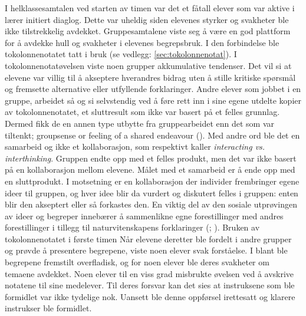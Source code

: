 \documentclass[main.tex]{subfiles}
\begin{document}
I helklassesamtalen ved starten av timen var det et fåtall elever som var aktive i lærer initiert 
diaglog. Dette var uheldig siden elevenes styrker og svakheter ble ikke tilstrekkelig avdekket. 
Gruppesamtalene viste seg å være en god plattform for å avdekke hull og svakheter i elevenes 
begrepsbruk. I den forbindelse ble tokolonnenotatet tatt i bruk (se vedlegg: 
\ref{sec:tokolonnenotat}).
\newline
\newline
I tokolonnenotatøvelsen viste noen grupper akkumulative tendenser. Det vil si at elevene 
var villig til å akseptere hverandres bidrag uten å stille kritiske spørsmål og fremsette
alternative eller utfyllende forklaringer. Andre elever som jobbet i en gruppe, arbeidet så og si
selvstendig ved å føre rett inn i sine egene utdelte kopier av tokolonnenotatet, et sluttresult som 
ikke var basert på et felles grunnlag. Dermed fikk de en annen type utbytte fra gruppearbeidet
enn det som var tiltenkt; \guillemotleft groupsense or feeling of a shared endeavour
\guillemotright (). Med andre ord ble det en samarbeid og ikke 
et kollaborasjon, som  respektivt kaller \emph{interacting vs. interthinking}. 
Gruppen endte opp med et felles produkt, men det var ikke basert på en kollaborasjon mellom elevene. 
Målet med et samarbeid er å ende opp med en sluttprodukt. I motsetning er en kollaborasjon der 
individer frembringer egene ideer til gruppen, og hver idee blir da vurdert og diskutert felles i 
gruppen: enten blir den akseptert eller så forkastes den.
\newline
\newline
En viktig del av den sosiale utprøvingen av ideer og begreper innebærer å sammenlikne egne 
forestillinger med andres forestillinger i tillegg til naturvitenskapens forklaringer 
(; ). Bruken av tokolonnenotatet i første timen 
\newline
\newline
Når elevene deretter ble fordelt i andre grupper og prøvde å presentere begrepene, viste noen elever 
svak forståelse. I blant ble begrepene fremstilt overfladisk, og for noen elever ble deres svakheter 
om temaene avdekket. Noen elever til en viss grad misbrukte øvelsen ved å avskrive notatene til sine 
medelever. Til deres forsvar kan det sies at instruksene som ble formidlet var ikke tydelige nok. 
Uansett ble denne oppførsel irettesatt og klarere instrukser ble formidlet.
\newline
\newline
\end{document}
